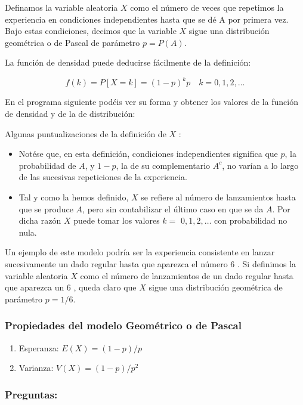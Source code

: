\documentclass[
  a4paper,
  DIV=11,
  numbers=noendperiod]{scrreprt}
\providecommand{\tightlist}{%
  \setlength{\itemsep}{0pt}\setlength{\parskip}{0pt}}\usepackage{longtable,booktabs,array}
\begin{document}
Definamos la variable aleatoria \(X\) como el número de veces que
repetimos la experiencia en condiciones independientes hasta que se dé A
por primera vez. Bajo estas condiciones, decimos que la variable \(X\)
sigue una distribución geométrica o de Pascal de parámetro \(p=P(A)\).

La función de densidad puede deducirse fácilmente de la definición:

\[
f(k)=P[X=k]=(1-p)^{k} p \quad k=0,1,2, \ldots
\]

En el programa siguiente podéis ver su forma y obtener los valores de la
función de densidad y de la de distribución:

Algunas puntualizaciones de la definición de \(X\) :

\begin{itemize}
\tightlist
\item
  Notése que, en esta definición, condiciones independientes significa
  que \(p\), la probabilidad de \(A\), y \(1-p\), la de su
  complementario \(A^{c}\), no varían a lo largo de las sucesivas
  repeticiones de la experiencia.
\item
  Tal y como la hemos definido, \(X\) se refiere al número de
  lanzamientos hasta que se produce \(A\), pero sin contabilizar el
  último caso en que se da \(A\). Por dicha razón \(X\) puede tomar los
  valores \(k=\) \(0,1,2, \ldots\) con probabilidad no nula.
\end{itemize}

Un ejemplo de este modelo podría ser la experiencia consistente en
lanzar sucesivamente un dado regular hasta que aparezca el número 6 . Si
definimos la variable aleatoria \(X\) como el número de lanzamientos de
un dado regular hasta que aparezca un 6 , queda claro que \(X\) sigue
una distribución geométrica de parámetro \(p=1 / 6\).

\subsubsection{Propiedades del modelo Geométrico o de
Pascal}\label{propiedades-del-modelo-geomuxe9trico-o-de-pascal}

\begin{enumerate}
\def\labelenumi{\arabic{enumi})}
\tightlist
\item
  Esperanza: \(E(X)=(1-p) / p\)
\item
  Varianza: \(V(X)=(1-p) / p^{2}\)
\end{enumerate}

\subsubsection{Preguntas:}\label{preguntas}
\end{document}
